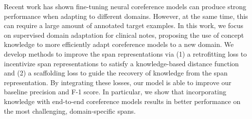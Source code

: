 Recent work has shown fine-tuning neural coreference models can produce strong performance when adapting to different domains. However, at the same time, this can require a large amount of annotated target examples. In this work, we focus on supervised domain adaptation for clinical notes, proposing the use of concept knowledge to more efficiently adapt coreference models to a new domain. We develop methods to improve the span representations via (1) a retrofitting loss to incentivize span representations to satisfy a knowledge-based distance function and (2) a scaffolding loss to guide the recovery of knowledge from the span representation. By integrating these losses, our model is able to improve our baseline precision and F-1 score. In particular, we show that incorporating knowledge with end-to-end coreference models results in better performance on the most challenging, domain-specific spans.
